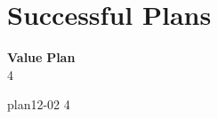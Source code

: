 \documentclass[a4paper,12pt]{article}
\begin{document}
\section{Successful Plans}
\begin{tabbing}
{\bf Value} \qquad \= {\bf Plan}\\[0.8ex]
4 \>\begin{minipage}[t]{12cm} plan12-02 4  \end{minipage}\\
 \>\\
\end{tabbing}
\end{document}
